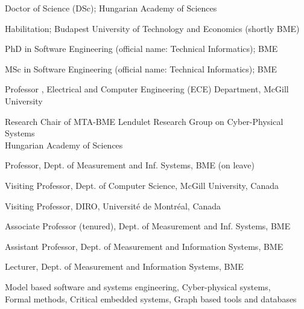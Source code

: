 \documentclass{xetexCV}
\begin{document}
\makecvtitle

Doctor of Science (DSc); Hungarian Academy of Sciences  


Habilitation; Budapest University of Technology and Economics (shortly BME) 

PhD in Software Engineering (official name: Technical Informatics);
BME %

MSc in Software Engineering (official name: Technical Informatics); 
BME %

Professor , Electrical and Computer Engineering (ECE) Department, McGill University

Research Chair  of MTA-BME Lendulet Research Group on Cyber-Physical Systems \\ Hungarian Academy of Sciences 

Professor,  Dept. of Measurement and
Inf. Systems, BME  (on leave)

Visiting Professor,  Dept. of Computer Science, McGill University, Canada

Visiting Professor,  DIRO, Universit\'e de Montr\'eal, Canada

Associate Professor (tenured),  Dept. of Measurement and
Inf. Systems, BME 	

Assistant Professor, Dept. of Measurement and
Information Systems, BME 

Lecturer, Dept. of Measurement and Information
Systems, BME

Model based software and systems engineering, Cyber-physical systems, \\
Formal methods, Critical embedded systems, Graph based tools and databases
\end{document}

